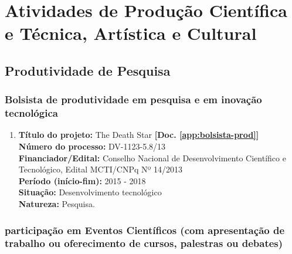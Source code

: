 \documentclass[a4paper,oneside,12pt]{article}
\begin{document}
\newpage
\section{Atividades de Produção Científica e Técnica, Artística e Cultural}

\subsection{Produtividade de Pesquisa}
\vspace{0.3cm}


\subsubsection{Bolsista de produtividade em pesquisa e em inovação tecnológica}
\vspace{0.3cm}

\begin{enumerate}
\renewcommand{\labelenumi}{{\large\bfseries\arabic{enumi}.}}

\item \textbf{Título do projeto:} The Death Star \textbf{[Doc. \ref{app:bolsista-prod}]}\\
      \textbf{N\'{u}mero do processo:} DV-1123-5.8/13\\
      \textbf{Financiador/Edital:} Conselho Nacional de Desenvolvimento Científico e Tecnológico, Edital MCTI/CNPq Nº 14/2013\\
      \textbf{Período (início-fim):} 2015 - 2018\\
      \textbf{Situação:} Desenvolvimento tecnológico\\
      \textbf{Natureza:} Pesquisa.

\end{enumerate}


\subsubsection{participação em Eventos Científicos (com apresentação de trabalho ou oferecimento de cursos, palestras ou debates)}
\vspace{0.3cm}
\end{document}
